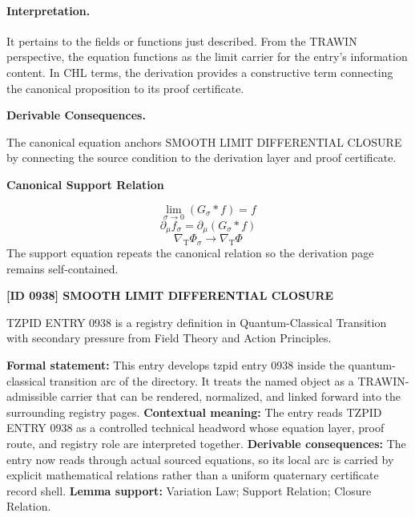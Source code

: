 \paragraph{Interpretation.}
It pertains to the fields or functions just described. From the TRAWIN perspective, the equation functions as the limit carrier for the entry’s information content. In CHL terms, the derivation provides a constructive term connecting the canonical proposition to its proof certificate.

\par\vspace{0.35em}
\noindent\textbf{Derivable Consequences.}\quad
\begingroup
\footnotesize
\raggedright
The canonical equation anchors SMOOTH LIMIT DIFFERENTIAL CLOSURE by connecting the source condition to the derivation layer and proof certificate.
\par\endgroup

\noindent\textbf{Canonical Support Relation}\par
\[
\lim_{\sigma\to 0}(G_{\sigma}*f)=f
\]
\[
\partial_{\mu}f_{\sigma}=\partial_{\mu}(G_{\sigma}*f)
\]
\[
\nabla_{\mathrm{T}}\Phi_{\sigma}\to \nabla_{\mathrm{T}}\Phi
\]
\noindent The support equation repeats the canonical relation so the derivation page remains self-contained.\par

\clearpage
\noindent\textbf{[ID 0938] SMOOTH LIMIT DIFFERENTIAL CLOSURE}\par
\vspace{0.35em}
\begingroup\small
{}
TZPID ENTRY 0938 is a registry definition in Quantum-Classical Transition with secondary pressure from Field Theory and Action Principles.

\begingroup\footnotesize\setlength{\emergencystretch}{3em}\sloppy
\textbf{Formal statement:} This entry develops tzpid entry 0938 inside the quantum-classical transition arc of the directory. It treats the named object as a TRAWIN-admissible carrier that can be rendered, normalized, and linked forward into the surrounding registry pages. \textbf{Contextual meaning:} The entry reads TZPID ENTRY 0938 as a controlled technical headword whose equation layer, proof route, and registry role are interpreted together. \textbf{Derivable consequences:} The entry now reads through actual sourced equations, so its local arc is carried by explicit mathematical relations rather than a uniform quaternary certificate record shell. \textbf{Lemma support:} Variation Law; Support Relation; Closure Relation.\par
\endgroup

